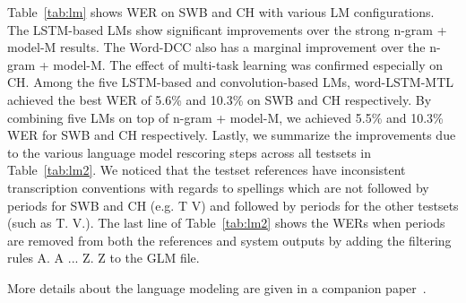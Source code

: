 \documentclass[a4paper]{article}
\begin{document}
Table~\ref{tab:lm} shows WER on SWB and CH with various LM
configurations.  The LSTM-based LMs show significant improvements over
the strong n-gram + model-M results.  The Word-DCC also has a marginal
improvement over the n-gram + model-M.  The effect of multi-task
learning was confirmed especially on CH.  Among the five LSTM-based
and convolution-based LMs, word-LSTM-MTL achieved the best WER of
5.6\% and 10.3\% on SWB and CH respectively. By combining five LMs on
top of n-gram + model-M, we achieved 5.5\% and 10.3\% WER for SWB and
CH respectively. Lastly, we summarize the improvements due to the
various language model rescoring steps across all testsets in
Table~\ref{tab:lm2}. We noticed that the testset references have
inconsistent transcription conventions with regards to spellings which
are not followed by periods for SWB and CH (e.g. T V) and followed by
periods for the other testsets (such as T. V.). The last line of
Table~\ref{tab:lm2} shows the WERs when periods are removed from both
the references and system outputs by adding the filtering rules A. 
A ... Z.  Z to the GLM file.

More details about the language modeling are
given in a companion paper~\cite{kurata17}.

\begin{table}[htpb!]
\begin{center}
\end{center}
\caption{\label{tab:lm2}
Word error rates for the different LM rescoring steps across all testsets. Last line shows WERs after '.' removal from the references and system outputs.}
\end{table}
\end{document}
